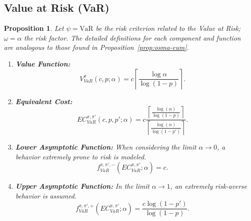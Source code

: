 \documentclass[runningheads]{llncs}
\newtheorem{proposition}{Proposition}
\begin{document}
\subsection{Value at Risk (VaR)}

\begin{proposition}\label{prop:osma-var}
    Let $\psi = \text{VaR}$ be the risk criterion related to the Value at Risk; $\omega = \alpha$ the risk factor. The detailed definitions for each component and function are analogous to those found in Proposition~\ref{prop:osma-eum}.
    \begin{enumerate}
        \item \textbf{Value Function:}
        \begin{equation}
            V^{\pi}_{VaR}(c, p; \alpha) = c  
            \left\lceil \frac{\log{\alpha}}{\log{(1-p)}} \right\rceil.
        \end{equation}
        
        \item \textbf{Equivalent Cost:}
        \begin{equation}
                EC^{\pi, \pi'}_{VaR}(c, p, p'; \alpha) = c \frac
                    { \left\lceil \frac{\log(\alpha)}{\log(1 - p)} \right\rceil }
                    { \left\lceil \frac{\log(\alpha)}{\log(1 - p')} \right\rceil }.
        \end{equation}
        
        \item \textbf{Lower Asymptotic Function:} When considering the limit $\alpha \to 0$, a behavior extremely prone to risk is modeled.
        \begin{equation}
            f^{\pi, \pi', -}_{VaR}(EC^{\pi, \pi'}_{VaR}; \alpha) = c.
        \end{equation}
        
        \item \textbf{Upper Asymptotic Function:} In the limit $\alpha \to 1$, an extremely risk-averse behavior is assumed.
        \begin{equation}
            f^{\pi, \pi', +}_{VaR}(EC^{\pi, \pi'}_{VaR}; \alpha) = 
            \frac
            {c \log{(1-p')}}
            {\log{(1-p)}}.
        \end{equation}
    \end{enumerate}
\end{proposition} 

\end{document}
